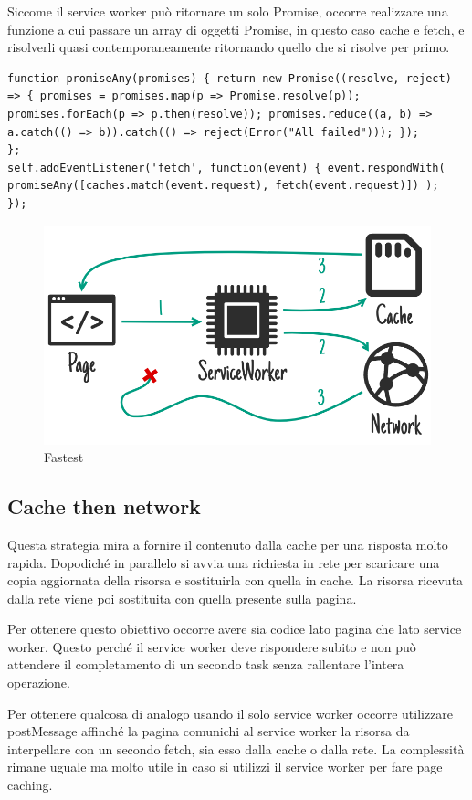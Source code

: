 \documentclass[italian]{article}
\begin{document}
Siccome il service worker può ritornare un solo Promise, occorre realizzare una funzione a cui passare un array di oggetti Promise, in questo caso cache e fetch, e risolverli quasi contemporaneamente ritornando quello che si risolve per primo.
\begin{lstlisting}
function promiseAny(promises) { return new Promise((resolve, reject) => { promises = promises.map(p => Promise.resolve(p)); promises.forEach(p => p.then(resolve)); promises.reduce((a, b) => a.catch(() => b)).catch(() => reject(Error("All failed"))); });
};
self.addEventListener('fetch', function(event) { event.respondWith( promiseAny([caches.match(event.request), fetch(event.request)]) );
});
\end{lstlisting}
\begin{figure}[h]
	\centering
	\includegraphics[width=1\linewidth]{Strategia5}
	\caption{Fastest}
	\label{fig: Fastest}
\end{figure}
\pagebreak
\subsection{Cache then network}
Questa strategia mira a fornire il contenuto dalla cache per una risposta molto rapida. Dopodiché in parallelo si avvia una richiesta in rete per scaricare una copia aggiornata della risorsa e sostituirla con quella in cache. La risorsa ricevuta dalla rete viene poi sostituita con quella presente sulla pagina.

Per ottenere questo obiettivo occorre avere sia codice lato pagina che lato service worker. Questo perché il service worker deve rispondere subito e non può attendere il completamento di un secondo task senza rallentare l’intera operazione.

Per ottenere qualcosa di analogo usando il solo service worker occorre utilizzare postMessage affinché la pagina comunichi al service worker la risorsa da interpellare con un secondo fetch, sia esso dalla cache o dalla rete. La complessità rimane uguale ma molto utile in caso si utilizzi il service worker per fare page caching.
\end{document}
